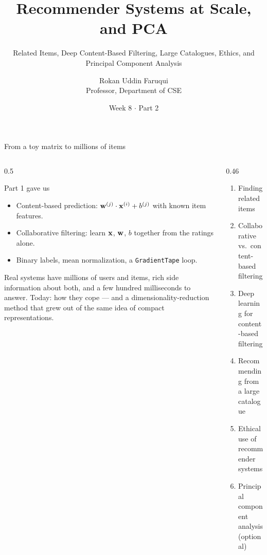 \documentclass[aspectratio=169,10pt]{beamer}
\title[CSE 815 -- Week 8, Part 2]{Recommender Systems at Scale, and PCA}
\subtitle{Related Items, Deep Content-Based Filtering, Large Catalogues, Ethics, and Principal Component Analysis}
\author{Rokan Uddin Faruqui\\ \small Professor, Department of CSE}
\institute{\small University of Chittagong \\ \texttt{rufaruqui@cu.ac.bd}}
\date[Week 8 / Part 2]{Week 8 $\cdot$ Part 2}
\begin{document}
\begin{frame}
  \titlepage
\end{frame}

\begin{frame}{From a toy matrix to millions of items}
  \begin{columns}[T,onlytextwidth]
    \begin{column}{0.5\textwidth}
      \begin{block}{Part 1 gave us}
        \footnotesize
        \begin{itemize}
          \item Content-based prediction: $\mathbf{w}^{(j)}\cdot\mathbf{x}^{(i)} + b^{(j)}$ with known
                item features.
          \item Collaborative filtering: learn $\mathbf{x}$, $\mathbf{w}$, $b$ together from the
                ratings alone.
          \item Binary labels, mean normalization, a \texttt{GradientTape} loop.
        \end{itemize}
      \end{block}
      \footnotesize
      Real systems have millions of users and items, rich side information about both,
      and a few hundred milliseconds to answer. Today: how they cope --- and a
      dimensionality-reduction method that grew out of the same idea of compact
      representations.
    \end{column}
    \begin{column}{0.46\textwidth}
      \begin{keyidea}[Today]
        \footnotesize
        \begin{enumerate}
          \item Finding related items
          \item Collaborative vs.\ content-based filtering
          \item Deep learning for content-based filtering
          \item Recommending from a large catalogue
          \item Ethical use of recommender systems
          \item Principal component analysis (optional)
        \end{enumerate}
      \end{keyidea}
    \end{column}
  \end{columns}
\end{frame}
\end{document}
